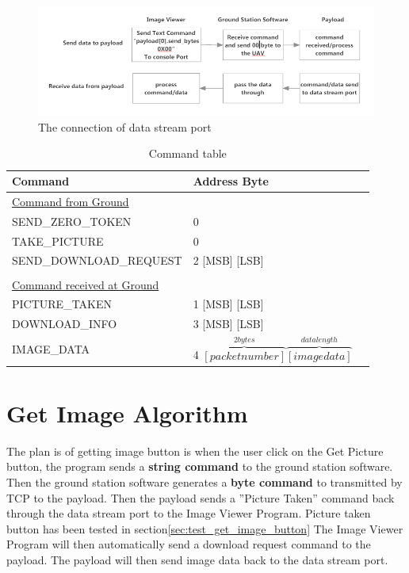 \begin{figure}[H]
\begin{center}
\includegraphics[scale=0.6]{figures/GCS_Payload_communication.png} 
\caption{The connection of data stream port\label{GCS_Payload_comm}}
\end{center}
\end{figure}

\begin{table}[H]

\begin{center}
\begin{tabular}{l l @{.} l}
 Command&
\multicolumn{2}{l}{Address Byte } \\

\hline
\underline{Command from Ground} & \\
SEND\_ZERO\_TOKEN & 0 \\
TAKE\_PICTURE & 0 \\
SEND\_DOWNLOAD\_REQUEST & 2 [MSB] [LSB]  \\
\\
\underline{Command received at Ground}\\
PICTURE\_TAKEN & 1 [MSB] [LSB]\\
DOWNLOAD\_INFO & 3 [MSB] [LSB]\\
IMAGE\_DATA & 4 $\overbrace{ [packet number]}^{2bytes} \overbrace{[image data]}^{data length}$ \\
\end{tabular}
\caption{Command table\label{command_table}}
\end{center}
\end{table}

\section{Get Image Algorithm}
\label{get image algorithm}
The plan is of getting image button is when the user click on the Get Picture button, the program sends a \textbf{string command} to the ground station software.
Then the ground station software generates a \textbf{byte command} to transmitted by TCP to the payload. 
Then the payload sends a ''Picture Taken'' command back through the data stream port to the Image Viewer Program. 
Picture taken button has been tested in section\ref{sec:test_get_image_button}
The Image Viewer Program will then automatically send a download request command to the payload. 
The payload will then send image data back to the data stream port. 


